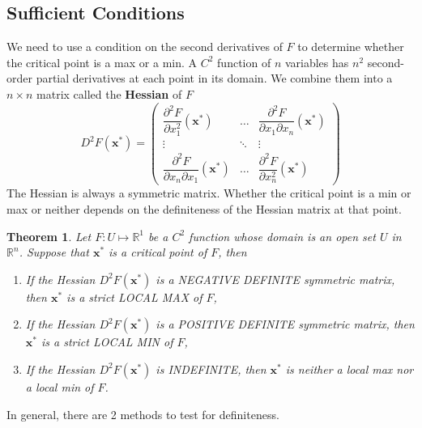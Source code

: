 \documentclass[11pt,a4paper]{book}
\newtheorem{theorem}{Theorem}[section]
\theoremstyle{definition}\newtheorem{definition}{Definition}
\theoremstyle{definition}\newtheorem{fact}{Fact}
\theoremstyle{definition}\newtheorem{remark}{Remark}
\theoremstyle{definition}\newtheorem{ex}{Ex.}
\theoremstyle{definition}\newtheorem{project}{Project}
\theoremstyle{definition}\newtheorem{problem}{Problem}
\theoremstyle{definition}\newtheorem{example}{Example}
\newenvironment{ftheorem}
{\begin{mdframed}\begin{theorem}}
		{\end{theorem}\end{mdframed}}
\numberwithin{theorem}{section}
\numberwithin{corollary}{chapter}
\numberwithin{assumption}{chapter}
\numberwithin{definition}{chapter}
\numberwithin{prop}{chapter}
\numberwithin{notation}{chapter}
\numberwithin{problem}{chapter}
\numberwithin{example}{chapter}
\numberwithin{fact}{chapter}
\numberwithin{ex}{chapter}
\def\R{\mathbb R}
\def\R{\mathbb R}
\def\x{\mathbf x}
\begin{document}
	\subsection{Sufficient Conditions}
	We need to use a condition on the second derivatives of $F$ to determine whether the critical point is a max or a min. A $C^2$ function of $n$ variables has $n^2$ second-order partial derivatives at each point in its domain. We combine them into a $n\times n$ matrix called the \textbf{Hessian} of $F$
	\begin{equation*}
		D^2 F(\x^*) = 
		\begin{pmatrix}
			\dfrac{\partial^2 F}{\partial x_1^2} (\x^*)            & \dots  & \dfrac{\partial^2 F}{\partial x_1 \partial x_n} (\x^*) \\
			\vdots                                                 & \ddots & \vdots                                                 \\
			\dfrac{\partial^2 F}{\partial x_n \partial x_1} (\x^*) & \dots  & \dfrac{\partial^2 F}{\partial x_n^2} (\x^*)            
		\end{pmatrix}
	\end{equation*}
	The Hessian is always a symmetric matrix. Whether the critical point is a min or max or neither depends on the definiteness of the Hessian matrix at that point.
	
	\begin{ftheorem}
		Let $F: U \mapsto \R^1$ be a $C^2$ function whose domain is an open set $U$ in $\R^n$. Suppose that $\x^*$ is a critical point of $F$, then
		\begin{enumerate}
			\item If the Hessian $D^2 F(\x^*)$ is a NEGATIVE DEFINITE symmetric matrix, then $\x^*$ is a strict LOCAL MAX of $F$,
			\item If the Hessian $D^2 F(\x^*)$ is a POSITIVE DEFINITE symmetric matrix, then $\x^*$ is a strict LOCAL MIN of $F$,
			\item If the Hessian $D^2 F(\x^*)$ is INDEFINITE, then $\x^*$ is neither a local max nor a local min of $F$.
		\end{enumerate}
	\end{ftheorem}
	
	In general, there are 2 methods to test for definiteness.
	
\end{document}
